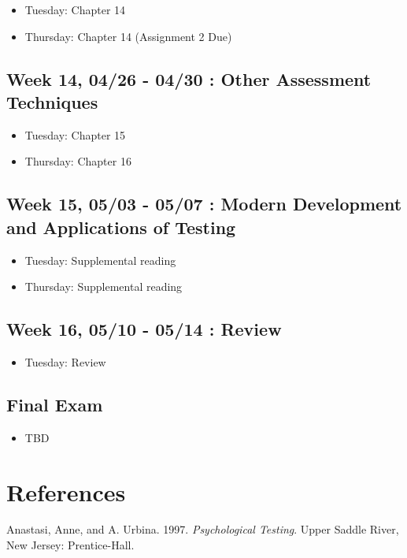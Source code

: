 \documentclass[11pt,]{article}
\providecommand{\tightlist}{%
  \setlength{\itemsep}{0pt}\setlength{\parskip}{0pt}}
\begin{document}
\begin{itemize}
\tightlist
\item
  Tuesday: Chapter 14
\item
  Thursday: Chapter 14 (Assignment 2 Due)
\end{itemize}

\hypertarget{week-14-0426---0430-other-assessment-techniques}{%
\subsection{Week 14, 04/26 - 04/30 : Other Assessment
Techniques}\label{week-14-0426---0430-other-assessment-techniques}}

\begin{itemize}
\tightlist
\item
  Tuesday: Chapter 15
\item
  Thursday: Chapter 16
\end{itemize}

\hypertarget{week-15-0503---0507-modern-development-and-applications-of-testing}{%
\subsection{Week 15, 05/03 - 05/07 : Modern Development and Applications
of
Testing}\label{week-15-0503---0507-modern-development-and-applications-of-testing}}

\begin{itemize}
\tightlist
\item
  Tuesday: Supplemental reading
\item
  Thursday: Supplemental reading
\end{itemize}

\hypertarget{week-16-0510---0514-review}{%
\subsection{Week 16, 05/10 - 05/14 :
Review}\label{week-16-0510---0514-review}}

\begin{itemize}
\tightlist
\item
  Tuesday: Review
\end{itemize}

\hypertarget{final-exam}{%
\subsection{Final Exam}\label{final-exam}}

\begin{itemize}
\tightlist
\item
  TBD
\end{itemize}

\hypertarget{references}{%
\section*{References}\label{references}}

\hypertarget{refs}{}
\leavevmode\hypertarget{ref-anastasi1997}{}%
Anastasi, Anne, and A. Urbina. 1997. \emph{Psychological Testing}. Upper
Saddle River, New Jersey: Prentice-Hall.
\end{document}
